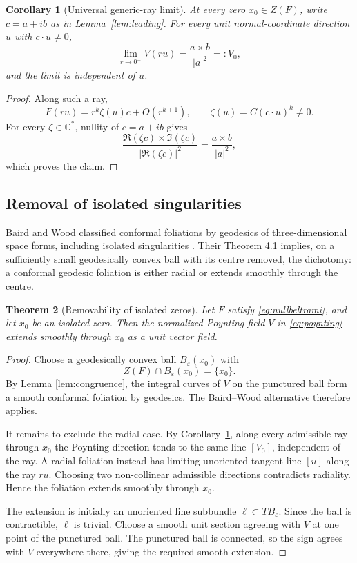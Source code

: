 \documentclass[aps,prd,reprint,nofootinbib,superscriptaddress]{revtex4-2}
\newtheorem{theorem}{Theorem}[section]
\newtheorem{corollary}[theorem]{Corollary}
\theoremstyle{definition}
\theoremstyle{remark}
\newcommand{\C}{\mathbb{C}}
\newcommand{\eps}{\varepsilon}
\begin{document}
\begin{corollary}[Universal generic-ray limit]
\label{cor:raylimit}
At every zero $x_0\in Z(F)$, write $c=a+ib$ as in Lemma~\ref{lem:leading}. For every unit normal-coordinate direction $u$ with $c\cdot u\ne0$,
\begin{equation}
\lim_{r\to0^+}V(ru)=\frac{a\times b}{|a|^2}=:V_0,
\label{eq:raylimit}
\end{equation}
and the limit is independent of $u$.
\end{corollary}
\begin{proof}
Along such a ray,
\[
F(ru)=r^k\zeta(u)c+O(r^{k+1}),
\qquad \zeta(u)=C(c\cdot u)^k\ne0.
\]
For every $\zeta\in\C^*$, nullity of $c=a+ib$ gives
\[
\frac{\Re(\zeta c)\times\Im(\zeta c)}{|\Re(\zeta c)|^2}
=\frac{a\times b}{|a|^2},
\]
which proves the claim.
\end{proof}

\subsection{Removal of isolated singularities}

Baird and Wood classified conformal foliations by geodesics of three-dimensional space forms, including isolated singularities \cite{BairdWood1991}. Their Theorem 4.1 implies, on a sufficiently small geodesically convex ball with its centre removed, the dichotomy: a conformal geodesic foliation is either radial or extends smoothly through the centre.

\begin{theorem}[Removability of isolated zeros]
\label{thm:isolated}
Let $F$ satisfy \eqref{eq:nullbeltrami}, and let $x_0$ be an isolated zero. Then the normalized Poynting field $V$ in \eqref{eq:poynting} extends smoothly through $x_0$ as a unit vector field.
\end{theorem}

\begin{proof}
Choose a geodesically convex ball $B_\eps(x_0)$ with
\[
Z(F)\cap B_\eps(x_0)=\{x_0\}.
\]
By Lemma \ref{lem:congruence}, the integral curves of $V$ on the punctured ball form a smooth conformal foliation by geodesics. The Baird--Wood alternative therefore applies.

It remains to exclude the radial case. By Corollary~\ref{cor:raylimit}, along every admissible ray through $x_0$ the Poynting direction tends to the same line $[V_0]$, independent of the ray. A radial foliation instead has limiting unoriented tangent line $[u]$ along the ray $ru$. Choosing two non-collinear admissible directions contradicts radiality. Hence the foliation extends smoothly through $x_0$.

The extension is initially an unoriented line subbundle $\ell\subset TB_\eps$. Since the ball is contractible, $\ell$ is trivial. Choose a smooth unit section agreeing with $V$ at one point of the punctured ball. The punctured ball is connected, so the sign agrees with $V$ everywhere there, giving the required smooth extension.
\end{proof}
\end{document}
